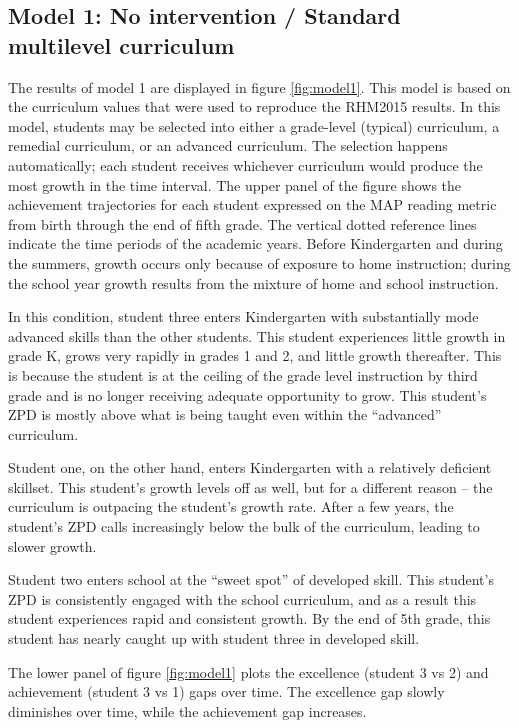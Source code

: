 \documentclass[english,floatsintext,jou]{apa6}
\theoremstyle{definition}
\theoremstyle{definition}
\theoremstyle{definition}
\theoremstyle{remark}
\begin{document}
\subsection{Model 1: No intervention / Standard multilevel
curriculum}\label{model-1-no-intervention-standard-multilevel-curriculum}

The results of model 1 are displayed in figure \ref{fig:model1}. This
model is based on the curriculum values that were used to reproduce the
RHM2015 results. In this model, students may be selected into either a
grade-level (typical) curriculum, a remedial curriculum, or an advanced
curriculum. The selection happens automatically; each student receives
whichever curriculum would produce the most growth in the time interval.
The upper panel of the figure shows the achievement trajectories for
each student expressed on the MAP reading metric from birth through the
end of fifth grade. The vertical dotted reference lines indicate the
time periods of the academic years. Before Kindergarten and during the
summers, growth occurs only because of exposure to home instruction;
during the school year growth results from the mixture of home and
school instruction.

In this condition, student three enters Kindergarten with substantially
mode advanced skills than the other students. This student experiences
little growth in grade K, grows very rapidly in grades 1 and 2, and
little growth thereafter. This is because the student is at the ceiling
of the grade level instruction by third grade and is no longer receiving
adequate opportunity to grow. This student's ZPD is mostly above what is
being taught even within the \enquote{advanced} curriculum.

Student one, on the other hand, enters Kindergarten with a relatively
deficient skillset. This student's growth levels off as well, but for a
different reason -- the curriculum is outpacing the student's growth
rate. After a few years, the student's ZPD calls increasingly below the
bulk of the curriculum, leading to slower growth.

Student two enters school at the \enquote{sweet spot} of developed
skill. This student's ZPD is consistently engaged with the school
curriculum, and as a result this student experiences rapid and
consistent growth. By the end of 5th grade, this student has nearly
caught up with student three in developed skill.

The lower panel of figure \ref{fig:model1} plots the excellence (student
3 vs 2) and achievement (student 3 vs 1) gaps over time. The excellence
gap slowly diminishes over time, while the achievement gap increases.
\end{document}
